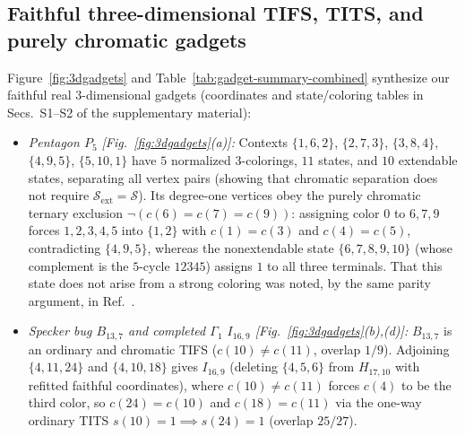 \documentclass[aps,pra,reprint,superscriptaddress,longbibliography,nofootinbib,floatfix,10pt]{revtex4-2}
\theoremstyle{definition}\newtheorem{definition}[theorem]{Definition}
\theoremstyle{remark}\newtheorem{remark}[theorem]{Remark}
\newcommand{\Sc}{\mathcal S}\newcommand{\Cc}{\mathcal C}
\begin{document}
\subsection{Faithful three-dimensional TIFS, TITS, and purely chromatic gadgets}\label{sec:3dgadgets}

Figure~\ref{fig:3dgadgets} and Table~\ref{tab:gadget-summary-combined} synthesize our faithful real $3$-dimensional gadgets (coordinates and state/coloring tables in Secs.~S1--S2 of the supplementary material):
\begin{itemize}
\item \emph{Pentagon $P_5$ [Fig.~\ref{fig:3dgadgets}(a)]:} Contexts $\{1,6,2\}$, $\{2,7,3\}$, $\{3,8,4\}$, $\{4,9,5\}$, $\{5,10,1\}$ have $5$ normalized $3$-colorings, $11$ states, and $10$ extendable states, separating all vertex pairs (showing that chromatic separation does not require $\Sc_{\mathrm{ext}}=\Sc$). Its degree-one vertices obey the purely chromatic ternary exclusion $\neg(c(6)=c(7)=c(9))$: assigning color $0$ to $6,7,9$ forces $1,2,3,4,5$ into $\{1,2\}$ with $c(1)=c(3)$ and $c(4)=c(5)$, contradicting $\{4,9,5\}$, whereas the nonextendable state $\{6,7,8,9,10\}$ (whose complement is the $5$-cycle $12345$) assigns $1$ to all three terminals. That this state does not arise from a strong coloring was noted, by the same parity argument, in Ref.~\cite{svozil-2025-color}.
\item \emph{Specker bug $B_{13,7}$ and completed $\Gamma_1$ $I_{16,9}$ [Fig.~\ref{fig:3dgadgets}(b),(d)]:} $B_{13,7}$ is an ordinary and chromatic TIFS ($c(10)\ne c(11)$, overlap $1/9$). Adjoining $\{4,11,24\}$ and $\{4,10,18\}$ gives $I_{16,9}$ (deleting $\{4,5,6\}$ from $H_{17,10}$ with refitted faithful coordinates), where $c(10)\ne c(11)$ forces $c(4)$ to be the third color, so $c(24)=c(10)$ and $c(18)=c(11)$ via the one-way ordinary TITS $s(10)=1\implies s(24)=1$ (overlap $25/27$).
\end{itemize}
\end{document}

